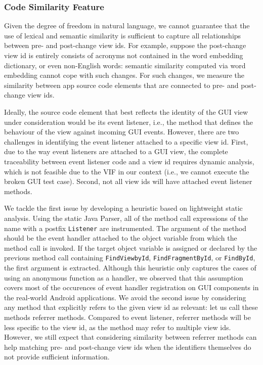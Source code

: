 \documentclass[sigconf]{acmart}
\begin{document}
\subsubsection{Code Similarity Feature}
\label{sec:codesim}

Given the degree of freedom in natural language, we cannot guarantee that
the use of lexical and semantic similarity is sufficient to capture all
relationships between pre- and post-change view ids. For example, suppose the
post-change view id is entirely consists of acronyms not contained in the word
embedding dictionary, or even non-English words: semantic similarity computed
via word embedding cannot cope with such changes. For such changes, we measure
the similarity between app source code elements that are connected to pre- and
post-change view ids.

Ideally, the source code element that best reflects the identity of the GUI
view under consideration would be its event listener, i.e., the method that
defines the behaviour of the view against incoming GUI events. However, there
are two challenges in identifying the event listener attached to a specific
view id. First, due to the way event listeners are attached to a GUI view, the
complete traceability between event listener code and a view id requires
dynamic analysis, which is not feasible due to the VIF in our context (i.e.,
we cannot execute the broken GUI test case). Second, not all view ids will
have attached event listener methods.

We tackle the first issue by developing a heuristic based on lightweight
static analysis. Using the static Java Parser, all of the method call expressions of the name with a postfix \texttt{Listener} are instrumented. The argument of the method should be the event handler attached to the object variable from which the method call is invoked. If the target object variable is assigned or declared by the previous method call containing \texttt{FindViewbyId}, \texttt{FindFragmentById}, or \texttt{FindById}, the first argument is extracted. Although this heuristic only captures the cases of using an anonymous function as a handler, we observed that this assumption covers most of the occurences of event handler registration on GUI components in the real-world Android applications. We avoid the second issue by considering any method that
explicitly refers to the given view id as relevant: let us call these methods
referrer methods. Compared to event listener, referrer methods will be less
specific to the view id, as the method may refer to multiple view ids.
However, we still expect that considering similarity between referrer methods
can help matching pre- and post-change view ids when the identifiers
themselves do not provide sufficient information.
\end{document}
